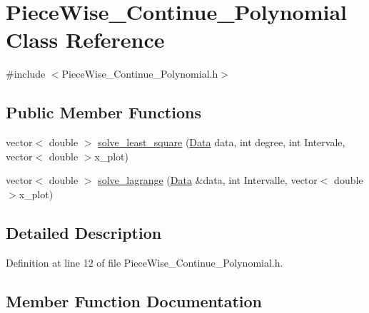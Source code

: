 \hypertarget{class_piece_wise___continue___polynomial}{}\section{Piece\+Wise\+\_\+\+Continue\+\_\+\+Polynomial Class Reference}
\label{class_piece_wise___continue___polynomial}


{\ttfamily \#include $<$Piece\+Wise\+\_\+\+Continue\+\_\+\+Polynomial.\+h$>$}

\subsection*{Public Member Functions}
\begin{DoxyCompactItemize}
\item 
vector$<$ double $>$ \mbox{\hyperlink{class_piece_wise___continue___polynomial_ae4e6583489b97d59121f04514521a901}{solve\+\_\+least\+\_\+square}} (\mbox{\hyperlink{struct_data}{Data}} data, int degree, int Intervale, vector$<$ double $>$x\+\_\+plot)
\item 
vector$<$ double $>$ \mbox{\hyperlink{class_piece_wise___continue___polynomial_a7fbf288a1307b1853e537d02d4e57da7}{solve\+\_\+lagrange}} (\mbox{\hyperlink{struct_data}{Data}} \&data, int Intervalle, vector$<$ double $>$x\+\_\+plot)
\end{DoxyCompactItemize}


\subsection{Detailed Description}


Definition at line 12 of file Piece\+Wise\+\_\+\+Continue\+\_\+\+Polynomial.\+h.



\subsection{Member Function Documentation}
\mbox{\label{class_piece_wise___continue___polynomial_a7fbf288a1307b1853e537d02d4e57da7}} 
